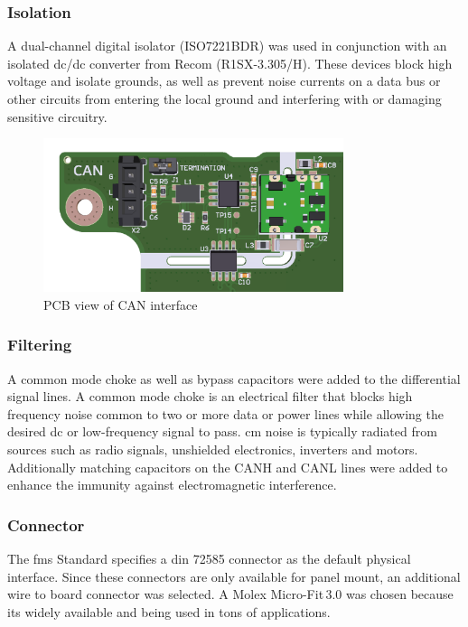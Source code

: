 \subsubsection{Isolation}
A dual-channel digital isolator (ISO7221BDR) was used in conjunction with an isolated \acrshort{dc}/\acrshort{dc} converter from Recom (R1SX-3.305/H). These devices block high voltage and isolate grounds, as well as prevent noise currents on a data bus or other circuits from entering the local ground and interfering with or damaging sensitive circuitry.

\begin{figure}[h!]
	\centering
	\includegraphics[height=4.5cm]{images/can-pcb}
	\caption{PCB view of CAN interface}
	\label{fig:can-pcb}
\end{figure}

\subsubsection{Filtering}
A common mode choke as well as bypass capacitors were added to the differential signal lines. A common mode choke is an electrical filter that blocks high frequency noise common to two or more data or power lines while allowing the desired \acrshort{dc} or low-frequency signal to pass. \acrfull{cm} noise is typically radiated from sources such as radio signals, unshielded electronics, inverters and motors. Additionally matching capacitors on the CANH and CANL lines were added to enhance the immunity against electromagnetic interference. 

\subsubsection{Connector}
The \acrshort{fms} Standard specifies a \acrshort{din} 72585 connector as the default physical interface. Since these connectors are only available for panel mount, an additional wire to board connector was selected. A Molex Micro-Fit\,3.0 was chosen because its widely available and being used in tons of applications.

